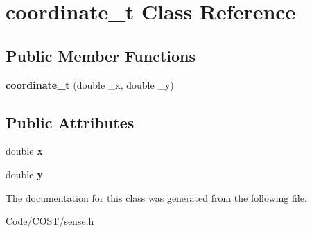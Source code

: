 \hypertarget{classcoordinate__t}{}\section{coordinate\+\_\+t Class Reference}
\label{classcoordinate__t}
\subsection*{Public Member Functions}
\begin{DoxyCompactItemize}
\item 
\mbox{\label{classcoordinate__t_a8d86ca6914f8c6e87516daa1cc01c6f3}} 
{\bfseries coordinate\+\_\+t} (double \+\_\+x, double \+\_\+y)
\end{DoxyCompactItemize}
\subsection*{Public Attributes}
\begin{DoxyCompactItemize}
\item 
\mbox{\label{classcoordinate__t_a789f5a8a4857669f629e6703b54394b2}} 
double {\bfseries x}
\item 
\mbox{\label{classcoordinate__t_a7d62cda91dc3d96389476584a1f5558f}} 
double {\bfseries y}
\end{DoxyCompactItemize}


The documentation for this class was generated from the following file\+:\begin{DoxyCompactItemize}
\item 
Code/\+C\+O\+S\+T/sense.\+h\end{DoxyCompactItemize}
